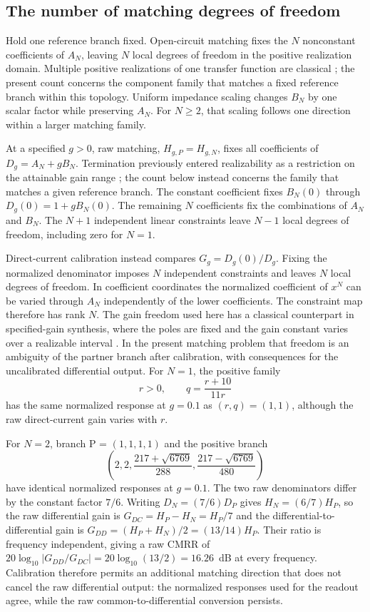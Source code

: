 \subsection{The number of matching degrees of freedom}

Hold one reference branch fixed. Open-circuit matching fixes the $N$ nonconstant coefficients of $A_N$, leaving $N$ local degrees of freedom in the positive realization domain. Multiple positive realizations of one transfer function are classical \citep{fialkow1951rcladder,fialkow1952rcnetworks}; the present count concerns the component family that matches a fixed reference branch within this topology. Uniform impedance scaling changes $B_N$ by one scalar factor while preserving $A_N$. For $N\geq2$, that scaling follows one direction within a larger matching family.

At a specified $g>0$, raw matching, $H_{g,P}=H_{g,N}$, fixes all coefficients of $D_g=A_N+gB_N$. Termination previously entered realizability as a restriction on the attainable gain range \citep{fialkow1951rcladder,fialkow1952rcnetworks}; the count below instead concerns the family that matches a given reference branch. The constant coefficient fixes $B_N(0)$ through $D_g(0)=1+gB_N(0)$. The remaining $N$ coefficients fix the combinations of $A_N$ and $B_N$. The $N+1$ independent linear constraints leave $N-1$ local degrees of freedom, including zero for $N=1$.

Direct-current calibration instead compares $G_g=D_g(0)/D_g$. Fixing the normalized denominator imposes $N$ independent constraints and leaves $N$ local degrees of freedom. In coefficient coordinates the normalized coefficient of $x^N$ can be varied through $A_N$ independently of the lower coefficients. The constraint map therefore has rank $N$. The gain freedom used here has a classical counterpart in specified-gain synthesis, where the poles are fixed and the gain constant varies over a realizable interval \citep{fialkow1951rcladder,paige1960maximum,wang2017rcladder}. In the present matching problem that freedom is an ambiguity of the partner branch after calibration, with consequences for the uncalibrated differential output. For $N=1$, the positive family
\[
r>0,\qquad q=\frac{r+10}{11r}
\]
has the same normalized response at $g=0.1$ as $(r,q)=(1,1)$, although the raw direct-current gain varies with $r$.

For $N=2$, branch P = $(1,1,1,1)$ and the positive branch
\[
\left(2,2,\frac{217+\sqrt{6769}}{288},\frac{217-\sqrt{6769}}{480}\right)
\]
have identical normalized responses at $g=0.1$. The two raw denominators differ by the constant factor $7/6$. Writing $D_N=(7/6)D_P$ gives $H_N=(6/7)H_P$, so the raw differential gain is $G_{DC}=H_P-H_N=H_P/7$ and the differential-to-differential gain is $G_{DD}=(H_P+H_N)/2=(13/14)H_P$. Their ratio is frequency independent, giving a raw CMRR of $20\log_{10}|G_{DD}/G_{DC}|=20\log_{10}(13/2)=16.26$~dB at every frequency. Calibration therefore permits an additional matching direction that does not cancel the raw differential output: the normalized responses used for the readout agree, while the raw common-to-differential conversion persists.

